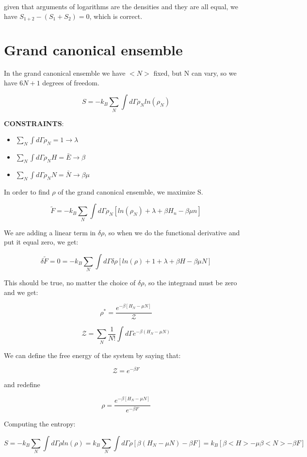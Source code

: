 \documentclass[a4paper, italian, openany]{book}
\begin{document}
given that arguments of logarithms are the densities and they are all equal, we have $S_{1+2}-(S_{1}+S_{2}) = 0$, which is correct.

\section{Grand canonical ensemble}

In the grand canonical ensemble we have $<N>$ fixed, but N can vary, so we have $6N+1$ degrees of freedom.

$$S = -k_B \sum_N \int d\Gamma \rho_N ln \left ( \rho_N \right )$$

\textbf{CONSTRAINTS}:
\begin{itemize}
\item $\sum_N \int d\Gamma \rho_N =1 \rightarrow \lambda$
\item $\sum_N \int d\Gamma \rho_N H = \bar{E} \rightarrow \beta$
\item $\sum_N \int d\Gamma \rho_N N = \bar{N} \rightarrow \beta \mu$
\end{itemize}

In order to find $\rho$ of the grand canonical ensemble, we maximize S.

$$\tilde{F} = - k_B \sum_N \int d\Gamma \rho_N \left [ ln\left ( \rho_N \right ) + \lambda + \beta H_n - \beta \mu n \right ]$$

We are adding a linear term in $\delta \rho$, so when we do the functional derivative and put it equal zero, we get:

$$\delta \tilde{F} = 0 = -k_B \sum_N \int d\Gamma \delta \rho \left [ ln \left ( \rho \right ) + 1 + \lambda + \beta H - \beta \mu N\right ]$$

This should be true, no matter the choice of $\delta \rho$, so the integrand must be zero and we get:

$$\rho^* =  \frac{e^{-\beta\left [ H_N - \mu N \right ]}}{\mathcal{Z}}$$

$$\mathcal{Z} = \sum_N \frac{1}{N!} \int d\Gamma e^{-\beta\left ( H_N - \mu N \right )} $$

We can define the free energy of the system by saying that:

$$\mathcal{Z} = e^{-\beta F}$$

and redefine 

$$\rho = \frac{e^{-\beta\left [ H_N - \mu N \right ]}}{e^{-\beta F}}$$

Computing the entropy:

$$S = -k_B \sum_N \int d\Gamma \rho ln(\rho) = k_B \sum_N \int d\Gamma \rho \left [ \beta(H_N - \mu N) -\beta F \right ] = k_B \left [ \beta <H> - \mu \beta <N> -\beta F \right ]$$
\end{document}
